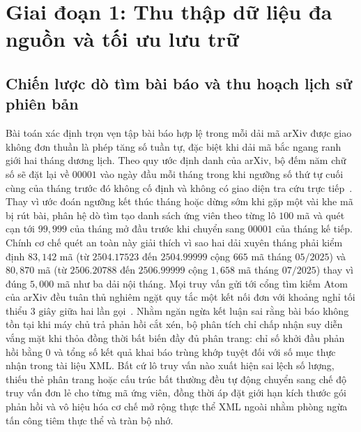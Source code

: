 \section{Giai đoạn 1: Thu thập dữ liệu đa nguồn và tối ưu lưu trữ}

\subsection{Chiến lược dò tìm bài báo và thu hoạch lịch sử phiên bản}

Bài toán xác định trọn vẹn tập bài báo hợp lệ trong mỗi dải mã arXiv được giao không đơn thuần là phép tăng số tuần tự, đặc biệt khi dải mã bắc ngang ranh giới hai tháng dương lịch. Theo quy ước định danh của arXiv, bộ đếm năm chữ số sẽ đặt lại về $00001$ vào ngày đầu mỗi tháng trong khi ngưỡng số thứ tự cuối cùng của tháng trước đó không cố định và không có giao diện tra cứu trực tiếp~\cite{arxiv_api}. Thay vì ước đoán ngưỡng kết thúc tháng hoặc dừng sớm khi gặp một vài khe mã bị rút bài, phân hệ dò tìm tạo danh sách ứng viên theo từng lô $100$ mã và quét cạn tới $99{,}999$ của tháng mở đầu trước khi chuyển sang $00001$ của tháng kế tiếp. Chính cơ chế quét an toàn này giải thích vì sao hai dải xuyên tháng phải kiểm định $83{,}142$ mã (từ $2504.17523$ đến $2504.99999$ cộng $665$ mã tháng $05/2025$) và $80{,}870$ mã (từ $2506.20788$ đến $2506.99999$ cộng $1{,}658$ mã tháng $07/2025$) thay vì đúng $5{,}000$ mã như ba dải nội tháng. Mọi truy vấn gửi tới cổng tìm kiếm Atom của arXiv đều tuân thủ nghiêm ngặt quy tắc một kết nối đơn với khoảng nghỉ tối thiểu $3\text{ giây}$ giữa hai lần gọi~\cite{arxiv_api}. Nhằm ngăn ngừa kết luận sai rằng bài báo không tồn tại khi máy chủ trả phản hồi cắt xén, bộ phân tích chỉ chấp nhận suy diễn vắng mặt khi thỏa đồng thời bất biến đầy đủ phân trang: chỉ số khởi đầu phản hồi bằng $0$ và tổng số kết quả khai báo trùng khớp tuyệt đối với số mục thực nhận trong tài liệu XML. Bất cứ lô truy vấn nào xuất hiện sai lệch số lượng, thiếu thẻ phân trang hoặc cấu trúc bất thường đều tự động chuyển sang chế độ truy vấn đơn lẻ cho từng mã ứng viên, đồng thời áp đặt giới hạn kích thước gói phản hồi và vô hiệu hóa cơ chế mở rộng thực thể XML ngoài nhằm phòng ngừa tấn công tiêm thực thể và tràn bộ nhớ.

